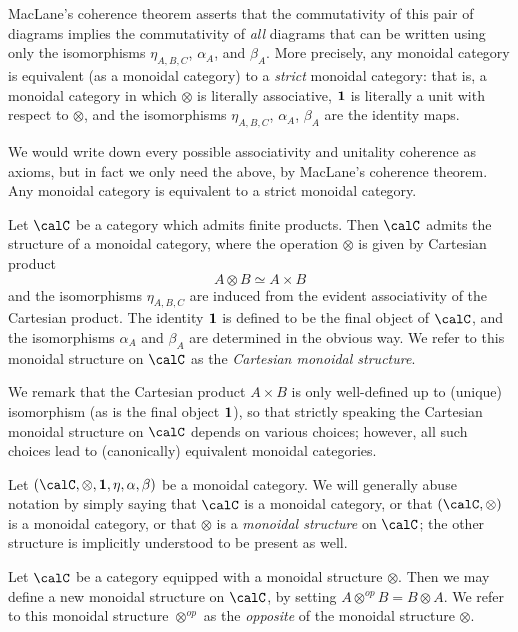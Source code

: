 \begin{CategoryTheory}
MacLane's coherence theorem asserts that the commutativity of this pair of diagrams implies the commutativity of {\em all} diagrams that can be written using only the isomorphisms $\eta_{A,B,C}$, $\alpha_A$, and $\beta_A$. More precisely, any monoidal category is equivalent (as a monoidal category) to a {\em strict} monoidal category: that is, a monoidal category in which $\otimes$ is literally associative, ${\bf 1}$ is literally a unit with respect to $\otimes$, and the isomorphisms $\eta_{A,B,C}$, $\alpha_A$, $\beta_A$ are the identity maps.
\begin{shaded}
We would write down every possible associativity and unitality coherence as axioms, but in fact we only need the above, by MacLane's coherence theorem. Any monoidal category is equivalent to a strict monoidal category.
\end{shaded}


\begin{example}
Let $\calC$ be a category which admits finite products. Then $\calC$ admits the structure of a monoidal category, where the operation $\otimes$ is given by Cartesian product
$$ A \otimes B \simeq A \times B$$
and the isomorphisms $\eta_{A,B,C}$ are induced from the evident associativity of the Cartesian product. The identity ${\bf 1}$ is defined to be the final object of $\calC$, and the isomorphisms
$\alpha_A$ and $\beta_A$ are determined in the obvious way. We refer to this monoidal structure on $\calC$ as the {\em Cartesian monoidal structure}.

We remark that the Cartesian product $A \times B$ is only well-defined up to (unique) isomorphism (as is the final object ${\bf 1}$), so that strictly speaking the Cartesian monoidal structure on $\calC$ depends on various choices; however, all such choices lead to (canonically) equivalent monoidal categories.
\end{example}

\begin{remark}
Let $(\calC, \otimes, {\bf 1}, \eta, \alpha, \beta)$ be a monoidal category. We will generally abuse notation by simply saying that $\calC$ is a monoidal category, or that $(\calC, \otimes)$ is a monoidal category, or that $\otimes$ is a {\it monoidal structure} on $\calC$; the other structure is implicitly understood to be present as well.
\end{remark}

\begin{remark}
Let $\calC$ be a category equipped with a monoidal structure $\otimes$. Then we may define a new monoidal structure on $\calC$, by setting $A \otimes^{op} B = B \otimes A$. We refer to this monoidal structure $\otimes^{op}$ as the {\it opposite} of the monoidal structure $\otimes$.
\end{remark}


\end{CategoryTheory}
